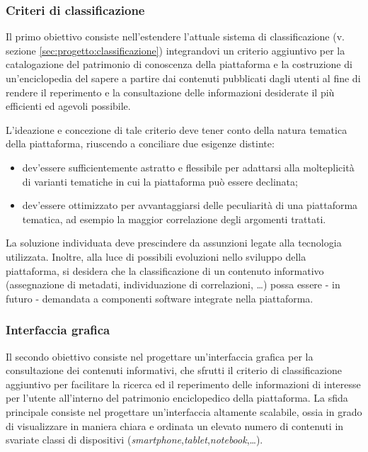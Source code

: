 \documentclass[11pt,a4paper,headsepline,hidelinks]{scrreprt} %
\begin{document}
	\subsubsection{Criteri di classificazione}
	\label{sec:tesi:stage:piano:obiettivi:criteri}
	Il primo obiettivo consiste nell'estendere l'attuale sistema di classificazione (v. sezione \ref{sec:progetto:classificazione}) integrandovi un criterio aggiuntivo per la catalogazione del patrimonio di conoscenza della piattaforma e la costruzione di un'enciclopedia del sapere a partire dai contenuti pubblicati dagli utenti al fine di rendere il reperimento e la consultazione delle informazioni desiderate il più efficienti ed agevoli possibile.
	
	L'ideazione e concezione di tale criterio deve tener conto della natura tematica della piattaforma, riuscendo a conciliare due esigenze distinte:
	\begin{itemize}
	  \item dev'essere sufficientemente astratto e flessibile per adattarsi alla molteplicità di varianti tematiche in cui la piattaforma può essere declinata;
	  \item dev'essere ottimizzato per avvantaggiarsi delle peculiarità di una piattaforma tematica, ad esempio la maggior correlazione degli argomenti trattati.
	\end{itemize}

	La soluzione individuata deve prescindere da assunzioni legate alla tecnologia utilizzata. Inoltre, alla luce di possibili evoluzioni nello sviluppo della piattaforma, si desidera che la classificazione di un contenuto informativo (assegnazione di metadati, individuazione di correlazioni, \ldots) possa essere - in futuro - demandata a componenti software integrate nella piattaforma.
	
	\subsubsection{Interfaccia grafica}
	\label{sec:tesi:stage:piano:obiettivi:interfaccia}
	Il secondo obiettivo consiste nel progettare un'interfaccia grafica per la consultazione dei contenuti informativi, che sfrutti il criterio di classificazione aggiuntivo per facilitare la ricerca ed il reperimento delle informazioni di interesse per l'utente all'interno del patrimonio enciclopedico della piattaforma. La sfida principale consiste nel progettare un'interfaccia altamente scalabile, ossia in grado di visualizzare in maniera chiara e ordinata un elevato numero di contenuti in svariate classi di dispositivi (\textit{smartphone},\textit{tablet},\textit{notebook},\ldots).
	
\end{document}

